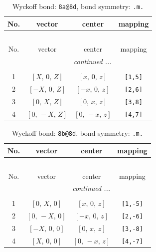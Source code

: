 \documentclass[fleqn,8pt]{jsarticle}
\begin{document}
\begin{longtable}{cccc}
\caption{Wyckoff bond: {\tt 8a@8d}, bond symmetry: {\tt .m.}}
 \\
 \hline \hline
No. & vector & center & mapping \\ \hline \endfirsthead

\multicolumn{3}{l}{\tablename\ \thetable{}} \\
 \hline \hline
No. & vector & center & mapping \\ \hline \endhead

 \hline \hline
\multicolumn{3}{r}{\footnotesize\it continued ...} \\ \endfoot

 \hline \hline
\multicolumn{3}{r}{} \\ \endlastfoot

1 & $\left[ X,\, 0,\, Z \right]$ & $\left[ x,\, 0,\, z \right]$ & {\tt [1,5]} \\ \hline
2 & $\left[ - X,\, 0,\, Z \right]$ & $\left[ - x,\, 0,\, z \right]$ & {\tt [2,6]} \\ \hline
3 & $\left[ 0,\, X,\, Z \right]$ & $\left[ 0,\, x,\, z \right]$ & {\tt [3,8]} \\ \hline
4 & $\left[ 0,\, - X,\, Z \right]$ & $\left[ 0,\, - x,\, z \right]$ & {\tt [4,7]} \\
\end{longtable}
\renewcommand{\arraystretch}{1.2}
\begin{longtable}{cccc}
\caption{Wyckoff bond: {\tt 8b@8d}, bond symmetry: {\tt .m.}}
 \\
 \hline \hline
No. & vector & center & mapping \\ \hline \endfirsthead

\multicolumn{3}{l}{\tablename\ \thetable{}} \\
 \hline \hline
No. & vector & center & mapping \\ \hline \endhead

 \hline \hline
\multicolumn{3}{r}{\footnotesize\it continued ...} \\ \endfoot

 \hline \hline
\multicolumn{3}{r}{} \\ \endlastfoot

1 & $\left[ 0,\, X,\, 0 \right]$ & $\left[ x,\, 0,\, z \right]$ & {\tt [1,-5]} \\ \hline
2 & $\left[ 0,\, - X,\, 0 \right]$ & $\left[ - x,\, 0,\, z \right]$ & {\tt [2,-6]} \\ \hline
3 & $\left[ - X,\, 0,\, 0 \right]$ & $\left[ 0,\, x,\, z \right]$ & {\tt [3,-8]} \\ \hline
4 & $\left[ X,\, 0,\, 0 \right]$ & $\left[ 0,\, - x,\, z \right]$ & {\tt [4,-7]} \\
\end{longtable}
\end{document}
